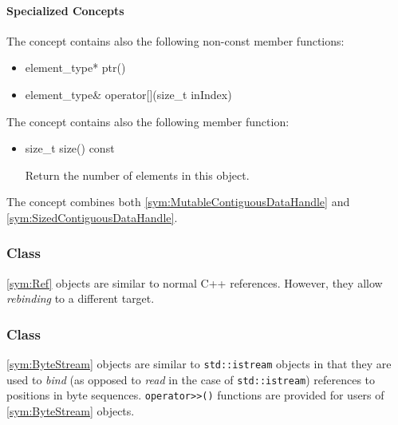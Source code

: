 \paragraph{Specialized Concepts}

The concept  contains also the following non-const member functions:
%
\begin{itemize}
	\item
		\begin{cppsnippet}
		element_type* ptr()
		\end{cppsnippet}

	\item
		\begin{cppsnippet}
		element_type& operator[](size_t inIndex)
		\end{cppsnippet}
\end{itemize}
%
The concept  contains also the following member function:
%
\begin{itemize}
	\item
		\begin{cppsnippet}
		size_t size() const
		\end{cppsnippet}
		
		Return the number of elements in this object.
\end{itemize}
%
The concept  combines both \ref{sym:MutableContiguousDataHandle} and \ref{sym:SizedContiguousDataHandle}.

\subsubsection[Class Ref]{Class }

\ref{sym:Ref} objects are similar to normal C++ references. However, they allow \emph{rebinding} to a different target.

\subsubsection[Class ByteStream]{Class }

\ref{sym:ByteStream} objects are similar to \texttt{std::istream} objects in that they are used to \emph{bind} (as opposed to \emph{read} in the case of \texttt{std::istream}) references to positions in byte sequences. \texttt{operator>\/>()} functions are provided for users of \ref{sym:ByteStream} objects.

